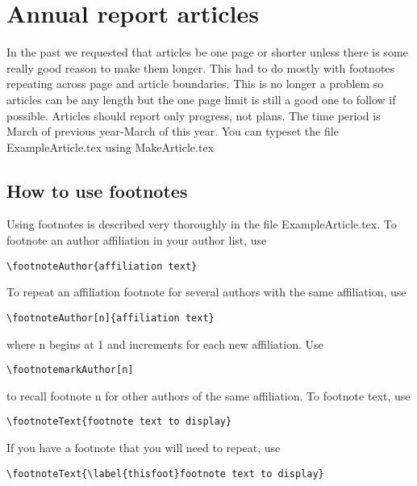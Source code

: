 \documentclass[twoside,11pt]{article}
\begin{document}
\section{Annual report articles}

In the past we requested that articles be one page or shorter unless there is some really good reason to make them longer. This had to do mostly with footnotes repeating across page and article boundaries. This is no longer a problem so articles can be any length but the one page limit is still a good one to follow if possible. Articles should report only progress, not plans. The time period is March of previous year-March of this year. You can typeset the file ExampleArticle.tex using MakeArticle.tex


\subsection{How to use footnotes}

Using footnotes is described very thoroughly in the file ExampleArticle.tex. To footnote an author affiliation in your author list, use

\begin{verbatim}
\footnoteAuthor{affiliation text} 
\end{verbatim}

\noindent
To repeat an affiliation footnote for several authors with the same affiliation, use 

\begin{verbatim}
\footnoteAuthor[n]{affiliation text}
\end{verbatim}

\noindent
where n begins at 1 and increments for each new affiliation. Use 

\begin{verbatim}
\footnotemarkAuthor[n] 
\end{verbatim}

\noindent
to recall footnote n for other authors of the same affiliation. To footnote text, use

\begin{verbatim}
\footnoteText{footnote text to display}  
\end{verbatim}

\noindent
If you have a footnote that you will need to repeat, use

\begin{verbatim}
\footnoteText{\label{thisfoot}footnote text to display} 
\end{verbatim}
\end{document}
